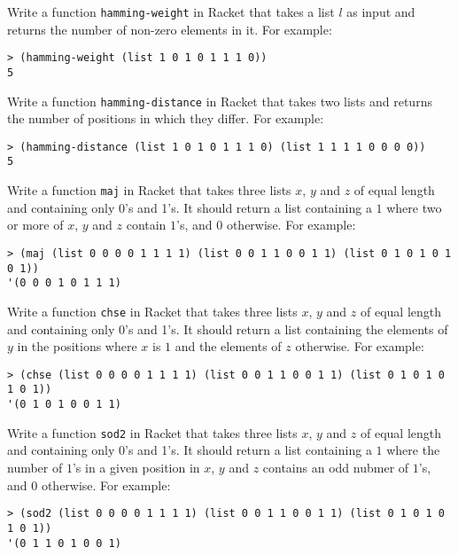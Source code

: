 \documentclass[a4paper, 12pt]{exam}
\begin{document}
\begin{questions}
\question
Write a function \texttt{hamming-weight} in Racket that takes a list $l$ as input and returns the number of non-zero elements in it.
For example:
\begin{verbatim}
> (hamming-weight (list 1 0 1 0 1 1 1 0))
5
\end{verbatim}

\question
Write a function \texttt{hamming-distance} in Racket that takes two lists and returns the number of positions in which they differ.
For example:
\begin{verbatim}
> (hamming-distance (list 1 0 1 0 1 1 1 0) (list 1 1 1 1 0 0 0 0))
5
\end{verbatim}

\question
Write a function \texttt{maj} in Racket that takes three lists $x$, $y$ and $z$ of equal length and containing only 0's and 1's.
It should return a list containing a $1$ where two or more of $x$, $y$ and $z$ contain $1$'s, and $0$ otherwise.
For example:
\begin{verbatim}
> (maj (list 0 0 0 0 1 1 1 1) (list 0 0 1 1 0 0 1 1) (list 0 1 0 1 0 1 0 1))
'(0 0 0 1 0 1 1 1)
\end{verbatim}

\question
Write a function \texttt{chse} in Racket that takes three lists $x$, $y$ and $z$ of equal length and containing only 0's and 1's.
It should return a list containing the elements of $y$ in the positions where $x$ is $1$ and the elements of $z$ otherwise.
For example:
\begin{verbatim}
> (chse (list 0 0 0 0 1 1 1 1) (list 0 0 1 1 0 0 1 1) (list 0 1 0 1 0 1 0 1))
'(0 1 0 1 0 0 1 1)
\end{verbatim}

\question
Write a function \texttt{sod2} in Racket that takes three lists $x$, $y$ and $z$ of equal length and containing only 0's and 1's.
It should return a list containing a $1$ where the number of $1$'s in a given position in $x$, $y$ and $z$ contains an odd nubmer of $1$'s, and $0$ otherwise.
For example:
\begin{verbatim}
> (sod2 (list 0 0 0 0 1 1 1 1) (list 0 0 1 1 0 0 1 1) (list 0 1 0 1 0 1 0 1))
'(0 1 1 0 1 0 0 1)
\end{verbatim}


\end{questions}



\end{document}
